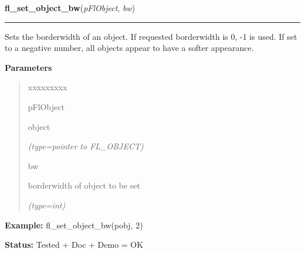\hspace{.8\funcindent}\begin{boxedminipage}{\funcwidth}

    \raggedright \textbf{fl\_set\_object\_bw}(\textit{pFlObject}, \textit{bw})

    \vspace{-1.5ex}

    \rule{\textwidth}{0.5\fboxrule}
\setlength{\parskip}{2ex}
    Sets the borderwidth of an object. If requested borderwidth is 0, -1 is
    used. If set to a negative number, all objects appear to have a softer 
    appearance.

\setlength{\parskip}{1ex}
      \textbf{Parameters}
      \vspace{-1ex}

      \begin{quote}
        \begin{Ventry}{xxxxxxxxx}

          \item[pFlObject]

          object

            {\it (type=pointer to FL\_OBJECT)}

          \item[bw]

          borderwidth of object to be set

            {\it (type=int)}

        \end{Ventry}

      \end{quote}

\textbf{Example:} fl\_set\_object\_bw(pobj, 2)



\textbf{Status:} Tested + Doc + Demo = OK



    \end{boxedminipage}

    \label{xformslib:flbasic:fl_get_object_bw}

    \vspace{0.5ex}

